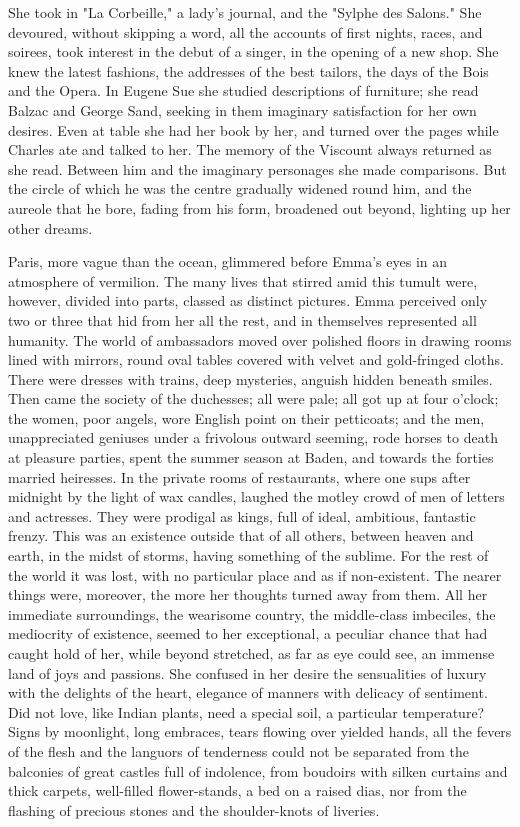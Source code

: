 \documentclass[11pt,twocolumn]{ltugboat}
\begin{document}
She took in "La Corbeille," a lady's journal, and the "Sylphe des
Salons." She devoured, without skipping a word, all the accounts of
first nights, races, and soirees, took interest in the debut of a
singer, in the opening of a new shop. She knew the latest fashions, the
addresses of the best tailors, the days of the Bois and the Opera. In
Eugene Sue she studied descriptions of furniture; she read Balzac and
George Sand, seeking in them imaginary satisfaction for her own desires.
Even at table she had her book by her, and turned over the pages
while Charles ate and talked to her. The memory of the Viscount always
returned as she read. Between him and the imaginary personages she made
comparisons. But the circle of which he was the centre gradually widened
round him, and the aureole that he bore, fading from his form, broadened
out beyond, lighting up her other dreams.

Paris, more vague than the ocean, glimmered before Emma's eyes in an
atmosphere of vermilion. The many lives that stirred amid this tumult
were, however, divided into parts, classed as distinct pictures. Emma
perceived only two or three that hid from her all the rest, and in
themselves represented all humanity. The world of ambassadors moved over
polished floors in drawing rooms lined with mirrors, round oval tables
covered with velvet and gold-fringed cloths. There were dresses with
trains, deep mysteries, anguish hidden beneath smiles. Then came the
society of the duchesses; all were pale; all got up at four o'clock; the
women, poor angels, wore English point on their petticoats; and the men,
unappreciated geniuses under a frivolous outward seeming, rode horses to
death at pleasure parties, spent the summer season at Baden, and towards
the forties married heiresses. In the private rooms of restaurants,
where one sups after midnight by the light of wax candles, laughed the
motley crowd of men of letters and actresses. They were prodigal as
kings, full of ideal, ambitious, fantastic frenzy. This was an existence
outside that of all others, between heaven and earth, in the midst of
storms, having something of the sublime. For the rest of the world it
was lost, with no particular place and as if non-existent. The nearer
things were, moreover, the more her thoughts turned away from them.
All her immediate surroundings, the wearisome country, the middle-class
imbeciles, the mediocrity of existence, seemed to her exceptional, a
peculiar chance that had caught hold of her, while beyond stretched, as
far as eye could see, an immense land of joys and passions. She confused
in her desire the sensualities of luxury with the delights of the heart,
elegance of manners with delicacy of sentiment. Did not love, like
Indian plants, need a special soil, a particular temperature? Signs
by moonlight, long embraces, tears flowing over yielded hands, all
the fevers of the flesh and the languors of tenderness could not be
separated from the balconies of great castles full of indolence,
from boudoirs with silken curtains and thick carpets, well-filled
flower-stands, a bed on a raised dias, nor from the flashing of precious
stones and the shoulder-knots of liveries.
\end{document}
